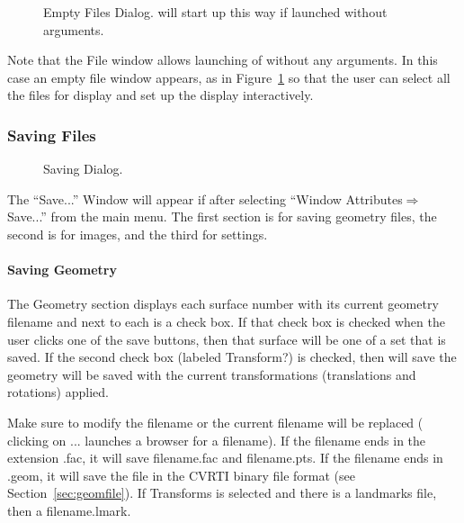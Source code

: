 \begin{figure}[htb]
  \begin{makeimage}
  \end{makeimage}
  \filesdialogthree
  \caption{\label{fig:file3} Empty Files Dialog. \map{} will start up this way
            if launched without arguments.}
\end{figure}

Note that the File window allows launching of \map{} without any arguments.
In this case an empty file window appears, as in Figure~\ref{fig:file3} so
that the user can select all the files for display and set up the display
interactively.


\subsubsection{Saving Files}
\label{sec:saving}

\begin{figure}[htb]
  \begin{makeimage}
  \end{makeimage}
  \savedialog
  \caption{\label{fig:save1} Saving Dialog.}
\end{figure}


The ``Save...'' Window will appear if after selecting ``Window
Attributes$\Rightarrow$Save...''  from the main \map{} menu.  The first
section is for saving geometry files, the second is for images, and the third
for settings.

\paragraph{Saving Geometry}
\label{sec:savegeom}

The Geometry section displays each surface number with its current geometry
filename and next to each is a check box.  If that check box is checked
when the user clicks one of the save buttons, then that surface will be one
of a set that is saved.  If the second check box (labeled Transform?)
is checked, then \map{} will save the geometry will be saved with the
current transformations (translations and rotations) applied.

Make sure to modify the filename or the current filename will be replaced (
clicking on ... launches a browser for a filename).  If the filename ends
in the extension .fac, it will save filename.fac and filename.pts.  If the
filename ends in .geom, it will save the file in the CVRTI binary file
format (see Section~\ref{sec:geomfile}). If Transforms is selected and
there is a landmarks file, then a filename.lmark.

